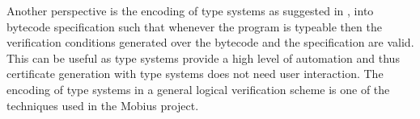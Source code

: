
Another perspective is the encoding of  type systems as suggested in \cite{BeringerH06},  into
bytecode specification such that whenever the program is typeable then  the verification conditions generated over
the bytecode and the specification are valid. This can be useful as type
systems provide a high level of automation and thus certificate generation
with type systems does not need user interaction.  The encoding of type
systems in a general logical verification scheme is one of the techniques used
in the Mobius project.


